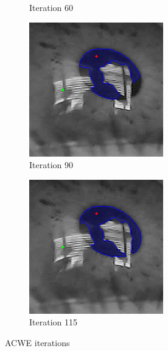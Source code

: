 \begin{figure}[h]
\begin{subfigure}{0.3\textwidth}
        \caption{Iteration 60}
    \end{subfigure}
    \hfill
    \begin{subfigure}{0.3\textwidth}
        \centering
        \includegraphics[width=0.9\linewidth]{plots/acwe/iteration_90.png}
        \caption{Iteration 90}
    \end{subfigure}
    \hfill
    \begin{subfigure}{0.3\textwidth}
        \centering
        \includegraphics[width=0.9\linewidth]{plots/acwe/iteration_115.png}
        \caption{Iteration 115}
    \end{subfigure}
    \caption{ACWE iterations}
    \label{fig:iterations_acwe}
\end{figure}

